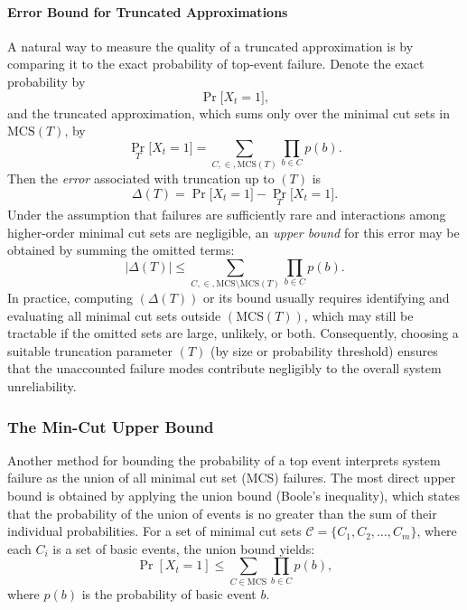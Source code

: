 \paragraph{Error Bound for Truncated Approximations}
A natural way to measure the quality of a truncated approximation is by comparing it to the exact probability of top-event failure. Denote the exact probability by
\[
\Pr\bigl[X_t = 1\bigr],
\]
and the truncated approximation, which sums only over the minimal cut sets in $\mathrm{MCS}(T)$, by
\[
\Pr_{T}\bigl[X_t = 1\bigr]
=
\sum_{C ,\in, \mathrm{MCS}(T)} \prod_{b \in C} p(b).
\]
Then the \emph{error} associated with truncation up to $(T)$ is
\begin{equation}\label{eq:truncation_error_definition}
\Delta(T)
=
\Pr\bigl[X_t = 1\bigr]
-
\Pr_{T}\bigl[X_t = 1\bigr].
\end{equation}
Under the assumption that failures are sufficiently rare and interactions among higher-order minimal cut sets are negligible, an \emph{upper bound} for this error may be obtained by summing the omitted terms:
\begin{equation}\label{eq:truncation_error_bound}
\bigl|\Delta(T)\bigr|
\le
\sum_{C ,\in, \mathrm{MCS}\setminus \mathrm{MCS}(T)}
\prod_{b \in C} p(b).
\end{equation}
In practice, computing $(\Delta(T))$ or its bound usually requires identifying and evaluating all minimal cut sets outside $(\mathrm{MCS}(T))$, which may still be tractable if the omitted sets are large, unlikely, or both. Consequently, choosing a suitable truncation parameter $(T)$ (by size or probability threshold) ensures that the unaccounted failure modes contribute negligibly to the overall system unreliability.

\subsubsection{The Min-Cut Upper Bound}
Another method for bounding the probability of a top event interprets system failure as the union of all minimal cut set (MCS) failures. The most direct upper bound is obtained by applying the union bound (Boole's inequality), which states that the probability of the union of events is no greater than the sum of their individual probabilities. For a set of minimal cut sets $\mathcal{C} = \{C_1, C_2, \ldots, C_m\}$, where each $C_i$ is a set of basic events, the union bound yields:
\begin{equation}
\label{eq:union_bound}
\Pr\left[X_t = 1\right] \leq \sum_{C \in \mathrm{MCS}} \prod_{b \in C} p(b),
\end{equation}
where $p(b)$ is the probability of basic event $b$.


